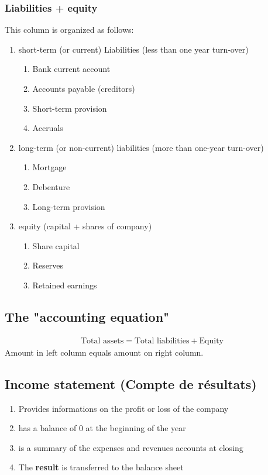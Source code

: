 \documentclass[a4paper] {scrartcl}
\begin{document}
\subsubsection{Liabilities + equity}
This column is organized as follows:
\begin{enumerate}
	\item short-term (or current) Liabilities (less than one year turn-over)
	\begin{enumerate}
		\item Bank current account
		\item Accounts payable (creditors)
		\item Short-term provision
		\item Accruals
	\end{enumerate}
	\item long-term (or non-current) liabilities (more than one-year turn-over)
	\begin{enumerate}
		\item Mortgage
		\item Debenture
		\item Long-term provision
	\end{enumerate}
	\item equity (capital + shares of company)
	\begin{enumerate}
		\item Share capital
		\item Reserves
		\item Retained earnings
	\end{enumerate}
\end{enumerate}



\subsection{The "accounting equation"}
\begin{eqnarray}
	\text{Total assets} = \text{Total liabilities} +\text{Equity}
\end{eqnarray}
Amount in left column equals amount on right column.

\subsection{Income statement (Compte de résultats)}
\begin{enumerate}
	\item Provides informations on the profit or loss of the company
	\item has a balance of $0$ at the beginning of the year
	\item is a summary of the expenses and revenues accounts at closing
	\item The \textbf{result} is transferred to the balance sheet
\end{enumerate}
\end{document}
